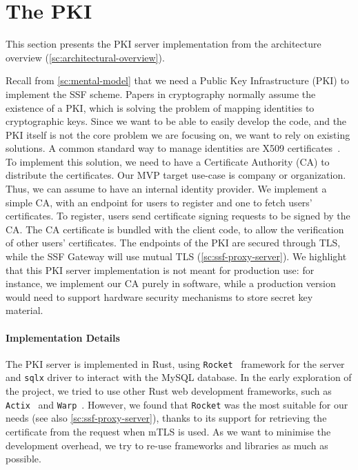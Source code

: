 \section{The PKI}\label{sc:PKI}

This section presents the PKI server implementation from the architecture overview (\cref{sc:architectural-overview}).

Recall from \cref{sc:mental-model} that
we need a Public Key Infrastructure (PKI) to implement the SSF scheme.
Papers in cryptography normally assume the existence of a PKI,
which is solving the problem of mapping identities to cryptographic keys.
Since we want to be able to easily develop the code, and the PKI itself
is not the core problem we are focusing on, we want to rely on existing
solutions.
A common standard way to manage identities are X509 certificates~\cite{rfc5280}.
To implement this solution, we need to have a Certificate Authority (CA)
to distribute the certificates.
Our MVP target use-case is company or organization. 
Thus, we can assume to have an internal identity provider.
We implement a simple CA, with an endpoint for users
to register and one to fetch users' certificates. 
To register, users send certificate signing
requests to be signed by the CA.
The CA certificate is bundled with the client code, to
allow the verification of other users' certificates.
The endpoints of the PKI are secured through TLS,
while the SSF Gateway will use mutual TLS (\cref{sc:ssf-proxy-server}).
We highlight that this PKI server implementation is not meant for production use:
for instance, we implement our CA purely in software, while a production
version would need to support hardware security mechanisms to
store secret key material.


\paragraph{Implementation Details} 
The PKI server is implemented in Rust, using \texttt{Rocket}~\cite{Rocket}
framework for the server and \texttt{sqlx} driver to interact
with the MySQL database.
In the early exploration of the project, we tried
to use other Rust web development frameworks,
such as \texttt{Actix}~\cite{Actix} and \texttt{Warp}~\cite{Warp}.
However, we found that \texttt{Rocket} was the most
suitable for our needs (see also \cref{sc:ssf-proxy-server}),
thanks to its support for retrieving the certificate
from the request when mTLS is used.
As we want to minimise the development overhead, we
try to re-use frameworks and libraries as much as possible. 

